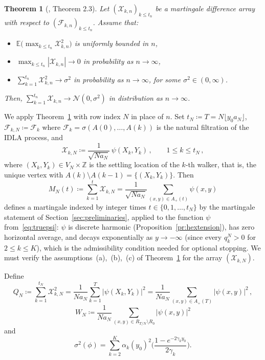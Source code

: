 \documentclass[11pt,a4paper,reqno]{amsart}
\newtheorem{Theorem}{Theorem}[section]
\theoremstyle{definition}
\newcommand{\cF}{\ensuremath{\mathcal F}}
\newcommand{\cN}{\ensuremath{\mathcal N}}
\newcommand{\cX}{\ensuremath{\mathcal X}}
\newcommand{\bbE}{{\ensuremath{\mathbb E}} }
\newcommand{\bbZ}{{\ensuremath{\mathbb Z}} }
\begin{document}
\begin{Theorem}[\cite{mcleish1974dependent}, Theorem 2.3]
\label{thm:martingale-CLT}
Let $(\cX_{k,n})_{k\leq t_n } $ be a martingale difference array with respect to $(\cF_{k,n} )_{k\leq t_n }$. Assume that: 
\begin{itemize}
\item[(a)] $\displaystyle \bbE \Big( \max_{k\leq t_n} \cX_{k,n}^2 \Big) $ is uniformly bounded in $n$, 
\item[(b)] $\displaystyle \max_{k\leq t_n} | \cX_{k,n} | \to 0 $ in probability as $n\to\infty$, 
\item[(c)] $\displaystyle \sum_{k=1}^{t_n} \cX_{k,n}^2 \to \sigma^2 $ 
in probability as $n\to\infty$, for some $\sigma^2 \in (0,\infty )$.
\end{itemize}
Then, $\displaystyle \sum_{k=1}^{t_n} \cX_{k,n} \to \cN (0,\sigma^2)$ in distribution as $n\to\infty$. 
\end{Theorem}
We apply Theorem~\ref{thm:martingale-CLT} with row index $N$ in place of $n$. Set $t_N \coloneqq T = N\lfloor y_0 a_N\rfloor$, $\cF_{k,N} \coloneqq \cF_k$ where $\cF_k = \sigma(A(0), \ldots, A(k))$ is the natural filtration of the IDLA process, and
	\[ \cX_{k,N} \coloneqq \frac{1}{\sqrt{Na_N}}\, \psi(X_k, Y_k)\,, \qquad 1 \leq k \leq t_N\,, \]
where $(X_k, Y_k) \in V_N \times \bbZ$ is the settling location of the $k$-th walker, that is, the unique vertex with $A(k) \setminus A(k-1) = \{ (X_k, Y_k) \}$. Then
	\[ M_N(t) \coloneqq \sum_{k=1}^{t} \cX_{k,N}
	= \frac{1}{\sqrt{Na_N}} \sum_{(x,y) \in A_+(t)} \psi(x,y) \]
defines a martingale indexed by integer times $t \in \{0, 1, \ldots, t_N\}$ by the martingale statement of Section~\ref{sec:preliminaries}, applied to the function $\psi$ from~\eqref{eq:truepsi}: $\psi$ is discrete harmonic (Proposition~\ref{pr:hextension}), has zero horizontal average, and decays exponentially as $y \to -\infty$ (since every $q_k^N > 0$ for $2 \leq k \leq K$), which is the admissibility condition needed for optional stopping. We must verify the assumptions~(a),~(b),~(c) of Theorem~\ref{thm:martingale-CLT} for the array $(\cX_{k,N})$.

Define
$$ Q_N \coloneqq \sum_{k=1}^{t_N} \cX_{k,N}^2 =
\frac{1}{N a_N} \sum_{k=1}^T | \psi(X_k,Y_k) |^2 =
\frac{1}{N a_N} \sum_{(x,y) \in A_+(T) } |\psi(x,y)|^2\,, $$
$$ W_N \coloneqq \frac{1}{N a_N} \sum_{(x,y) \in R_{T/N} \setminus R_0 } | \psi(x,y)|^2  $$
and
\[ \sigma^2 (\phi )  = \sum_{k=2}^K \alpha_k(y_0)^2 \bigg( \frac{1-e^{-2\gamma_k y_0}}{2\gamma_k} \bigg). \]
\end{document}

